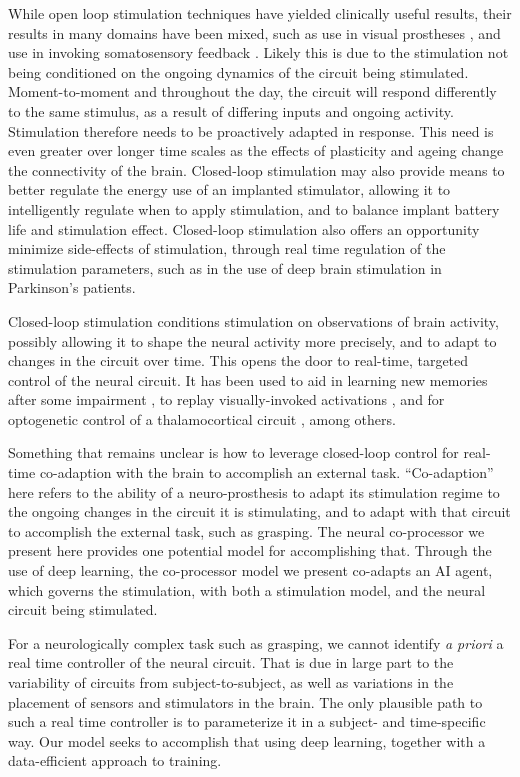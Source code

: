 \documentclass[12pt]{iopart}
\begin{document}
While open loop stimulation techniques have yielded clinically useful results,
their results in many domains have been mixed, such as use in visual
prostheses \cite{bosking.visual}, and use in invoking somatosensory feedback
\cite{cronin.tact}. Likely this is due to the stimulation not being conditioned
on the ongoing dynamics of the circuit being stimulated. Moment-to-moment and
throughout the day, the circuit will respond differently to the same stimulus,
as a result of differing inputs and ongoing activity. Stimulation
therefore needs to be proactively adapted in response. This need is even
greater over longer time scales as the effects of plasticity and ageing change
the connectivity of the brain. Closed-loop stimulation may also provide means
to better regulate the energy use of an implanted stimulator, allowing it to
intelligently regulate when to apply stimulation, and to balance implant
battery life and stimulation effect. Closed-loop stimulation also offers an
opportunity minimize side-effects of stimulation, through real time regulation
of the stimulation parameters, such as in the use of deep brain stimulation in
Parkinson's patients.

Closed-loop stimulation conditions stimulation on observations of brain activity,
possibly allowing it to shape the neural activity more precisely, and to adapt to changes
in the circuit over time. This opens the door to real-time, targeted control of the neural
circuit. It has been used to aid in learning new memories after some impairment
\cite{berger.closedloop, kahana.biomarker}, to replay visually-invoked
activations \cite{tafazoli.acls}, and for optogenetic control of
a thalamocortical circuit \cite{bolus.opto}, among others.

Something that remains unclear is how to leverage closed-loop control for real-time
co-adaption with the brain to accomplish an external task. ``Co-adaption'' here refers
to the ability of a neuro-prosthesis to adapt its stimulation regime to the ongoing
changes in the circuit it is stimulating, and to adapt with that circuit to accomplish
the external task, such as grasping. The neural co-processor we present here provides one
potential model for accomplishing that. Through the use of deep learning, the
co-processor model we present co-adapts an AI agent, which governs the
stimulation, with both a stimulation model, and the neural circuit being stimulated.

For a neurologically complex task such as grasping, we cannot identify
\textit{a priori} a real time controller of the neural circuit. That is
due in large part to the variability of circuits from subject-to-subject,
as well as variations in the placement of sensors and stimulators in the
brain. The only plausible path to such a real time controller is to parameterize
it in a subject- and time-specific way. Our model seeks to accomplish that using
deep learning, together with a data-efficient approach to training.
\end{document}
